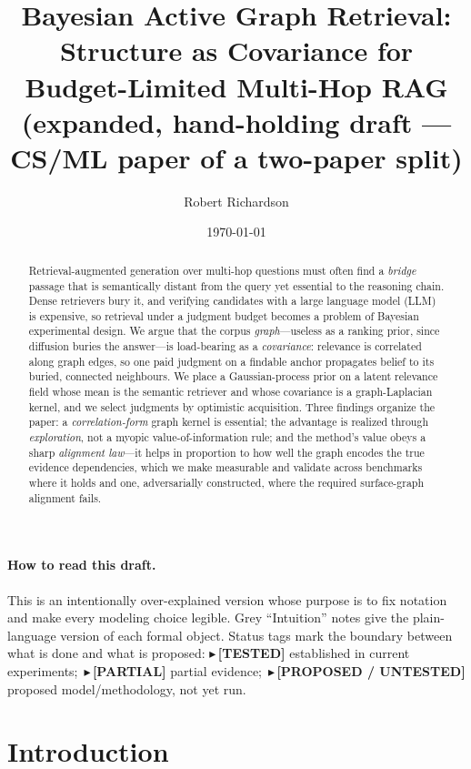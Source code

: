 \documentclass[11pt]{article}
\title{\textbf{Bayesian Active Graph Retrieval:\\ Structure as Covariance for Budget-Limited Multi-Hop RAG}\\[4pt]
\large\normalfont(expanded, hand-holding draft --- CS/ML paper of a two-paper split)}
\author{Robert Richardson}
\date{\today}
\newcommand{\TESTED}[1]{{\color{teal}\small$\blacktriangleright$\,\textbf{[TESTED]} #1}}
\newcommand{\PARTIAL}[1]{{\color{orange}\small$\blacktriangleright$\,\textbf{[PARTIAL]} #1}}
\newcommand{\PROP}[1]{{\color{violet}\small$\blacktriangleright$\,\textbf{[PROPOSED / UNTESTED]} #1}}
\begin{document}
\maketitle

\begin{abstract}
Retrieval-augmented generation over multi-hop questions must often find a \emph{bridge} passage that is
semantically distant from the query yet essential to the reasoning chain. Dense retrievers bury it, and
verifying candidates with a large language model (LLM) is expensive, so retrieval under a judgment budget
becomes a problem of Bayesian experimental design. We argue that the corpus \emph{graph}---useless as a ranking
prior, since diffusion buries the answer---is load-bearing as a \emph{covariance}: relevance is correlated
along graph edges, so one paid judgment on a findable anchor propagates belief to its buried, connected
neighbours. We place a Gaussian-process prior on a latent relevance field whose mean is the semantic retriever
and whose covariance is a graph-Laplacian kernel, and we select judgments by optimistic acquisition. Three
findings organize the paper: a \emph{correlation-form} graph kernel is essential; the advantage is realized
through \emph{exploration}, not a myopic value-of-information rule; and the method's value obeys a sharp
\emph{alignment law}---it helps in proportion to how well the graph encodes the true evidence dependencies,
which we make measurable and validate across benchmarks where it holds and one, adversarially constructed, where
the required surface-graph alignment fails.
\end{abstract}

\paragraph{How to read this draft.} This is an intentionally over-explained version whose purpose is to fix
notation and make every modeling choice legible. Grey ``Intuition'' notes give the plain-language version of
each formal object. Status tags mark the boundary between what is done and what is proposed:
\TESTED{} established in current experiments;\ \PARTIAL{} partial evidence;\ \PROP{} proposed model/methodology,
not yet run.

\tableofcontents

\section{Introduction}
\end{document}
